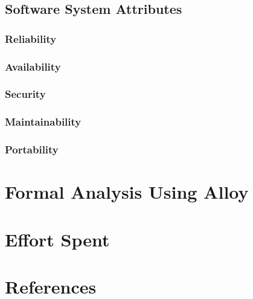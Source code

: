 \documentclass{Configuration_Files/PoliMi3i_thesis}
\begin{document}
    \section{Software System Attributes}\label{sec:software_system_attributes}

    \subsection{Reliability}\label{subsec:reliability}

    \subsection{Availability}\label{subsec:availability}

    \subsection{Security}\label{subsec:security}

    \subsection{Maintainability}\label{subsec:maintainability}

    \subsection{Portability}\label{subsec:portability}


    \chapter{Formal Analysis Using Alloy}\label{ch:formal_analysis_using_alloy}


    \chapter{Effort Spent}\label{ch:effort_spent}


    \chapter{References}\label{ch:references}



    \cleardoublepage
    \appendix
\end{document}
